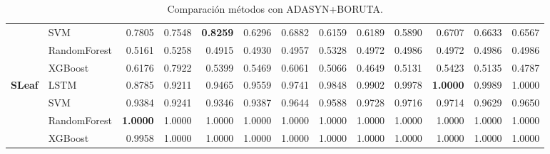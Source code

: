 \begin{table}[h]
\begin{adjustbox}{max width=15cm}
\begin{tabular}{|c|l|r|r|r|r|r|r|r|r|r|r|r|}
		& SVM &  0.7805 &  0.7548 &  \textbf{0.8259} &  0.6296 &  0.6882 &  0.6159 &  0.6189 &  0.5890 &  0.6707 &  0.6633 &  0.6567 \\
		& RandomForest &  0.5161 &  0.5258 &  0.4915 &  0.4930 &  0.4957 &  0.5328 &  0.4972 &  0.4986 &  0.4972 &  0.4986 &  0.4986 \\
		& XGBoost &  0.6176 &  0.7922 &  0.5399 &  0.5469 &  0.6061 &  0.5066 &  0.4649 &  0.5131 &  0.5423 &  0.5135 &  0.4787 \\
		\hline
		\textbf{SLeaf} & LSTM &  0.8785 &  0.9211 &  0.9465 &  0.9559 &  0.9741 &  0.9848 &  0.9902 &  0.9978 &  \textbf{1.0000} &  0.9989 &  1.0000 \\
		& SVM &  0.9384 &  0.9241 &  0.9346 &  0.9387 &  0.9644 &  0.9588 &  0.9728 &  0.9716 &  0.9714 &  0.9629 &  0.9650 \\
		& RandomForest &  \textbf{1.0000} &  1.0000 &  1.0000 &  1.0000 &  1.0000 &  1.0000 &  1.0000 &  1.0000 &  1.0000 &  1.0000 &  1.0000 \\
		& XGBoost &  0.9958 &  1.0000 &  1.0000 &  1.0000 &  1.0000 &  1.0000 &  1.0000 &  1.0000 &  1.0000 &  1.0000 &  1.0000 \\
		\hline
\end{tabular}
\end{adjustbox}
\caption{Comparación métodos con ADASYN+BORUTA.}
\label{tab:all_comp_adasyn_boruta}
\end{table}
\newpage
